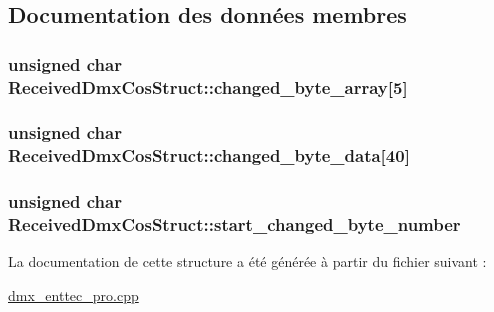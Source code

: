 \subsection{Documentation des données membres}
\hypertarget{struct_received_dmx_cos_struct_a863941290eeb0f634dd83aa8a2389718}{
\subsubsection[{changed\-\_\-byte\-\_\-array}]{\setlength{\rightskip}{0pt plus 5cm}unsigned char Received\-Dmx\-Cos\-Struct\-::changed\-\_\-byte\-\_\-array\mbox{[}5\mbox{]}}}\label{struct_received_dmx_cos_struct_a863941290eeb0f634dd83aa8a2389718}
\hypertarget{struct_received_dmx_cos_struct_aa3984590d4af300c37c465375dd7ba0f}{
\subsubsection[{changed\-\_\-byte\-\_\-data}]{\setlength{\rightskip}{0pt plus 5cm}unsigned char Received\-Dmx\-Cos\-Struct\-::changed\-\_\-byte\-\_\-data\mbox{[}40\mbox{]}}}\label{struct_received_dmx_cos_struct_aa3984590d4af300c37c465375dd7ba0f}
\hypertarget{struct_received_dmx_cos_struct_a4cf39b60236997522f11155b63b2f090}{
\subsubsection[{start\-\_\-changed\-\_\-byte\-\_\-number}]{\setlength{\rightskip}{0pt plus 5cm}unsigned char Received\-Dmx\-Cos\-Struct\-::start\-\_\-changed\-\_\-byte\-\_\-number}}\label{struct_received_dmx_cos_struct_a4cf39b60236997522f11155b63b2f090}


La documentation de cette structure a été générée à partir du fichier suivant \-:\begin{DoxyCompactItemize}
\item 
\hyperlink{dmx__enttec__pro_8cpp}{dmx\-\_\-enttec\-\_\-pro.\-cpp}\end{DoxyCompactItemize}
